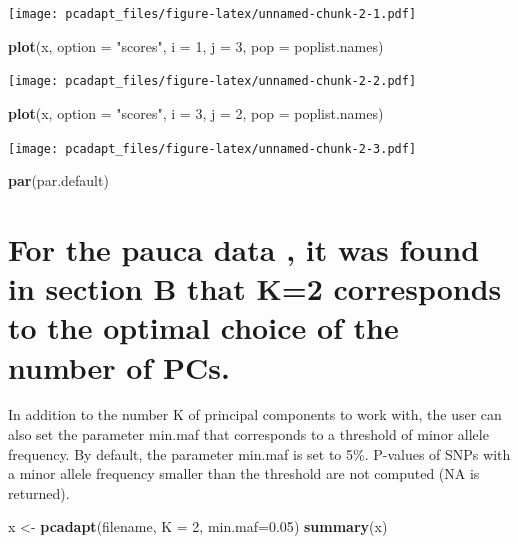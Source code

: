 \documentclass[]{article}
\newenvironment{Shaded}{\begin{snugshade}}{\end{snugshade}}
\newcommand{\KeywordTok}[1]{\textcolor[rgb]{0.13,0.29,0.53}{\textbf{#1}}}
\newcommand{\DataTypeTok}[1]{\textcolor[rgb]{0.13,0.29,0.53}{#1}}
\newcommand{\DecValTok}[1]{\textcolor[rgb]{0.00,0.00,0.81}{#1}}
\newcommand{\FloatTok}[1]{\textcolor[rgb]{0.00,0.00,0.81}{#1}}
\newcommand{\StringTok}[1]{\textcolor[rgb]{0.31,0.60,0.02}{#1}}
\newcommand{\NormalTok}[1]{#1}
\begin{document}
\texttt{[image: pcadapt\_files/figure-latex/unnamed-chunk-2-1.pdf]}

\begin{Shaded}
\begin{Highlighting}[]
\KeywordTok{plot}\NormalTok{(x, }\DataTypeTok{option =} \StringTok{"scores"}\NormalTok{, }\DataTypeTok{i =} \DecValTok{1}\NormalTok{, }\DataTypeTok{j =} \DecValTok{3}\NormalTok{, }\DataTypeTok{pop =}\NormalTok{ poplist.names)}
\end{Highlighting}
\end{Shaded}

\texttt{[image: pcadapt\_files/figure-latex/unnamed-chunk-2-2.pdf]}

\begin{Shaded}
\begin{Highlighting}[]
\KeywordTok{plot}\NormalTok{(x, }\DataTypeTok{option =} \StringTok{"scores"}\NormalTok{, }\DataTypeTok{i =} \DecValTok{3}\NormalTok{, }\DataTypeTok{j =} \DecValTok{2}\NormalTok{, }\DataTypeTok{pop =}\NormalTok{ poplist.names)}
\end{Highlighting}
\end{Shaded}

\texttt{[image: pcadapt\_files/figure-latex/unnamed-chunk-2-3.pdf]}

\begin{Shaded}
\begin{Highlighting}[]
\KeywordTok{par}\NormalTok{(par.default)}
\end{Highlighting}
\end{Shaded}

\section{For the pauca data , it was found in section B that K=2
corresponds to the optimal choice of the number of
PCs.}\label{for-the-pauca-data-it-was-found-in-section-b-that-k2-corresponds-to-the-optimal-choice-of-the-number-of-pcs.}

In addition to the number K of principal components to work with, the
user can also set the parameter min.maf that corresponds to a threshold
of minor allele frequency. By default, the parameter min.maf is set to
5\%. P-values of SNPs with a minor allele frequency smaller than the
threshold are not computed (NA is returned).

\begin{Shaded}
\begin{Highlighting}[]
\NormalTok{x <-}\StringTok{ }\KeywordTok{pcadapt}\NormalTok{(filename, }\DataTypeTok{K =} \DecValTok{2}\NormalTok{, }\DataTypeTok{min.maf=}\FloatTok{0.05}\NormalTok{)}
\KeywordTok{summary}\NormalTok{(x)}
\end{Highlighting}
\end{Shaded}
\end{document}
